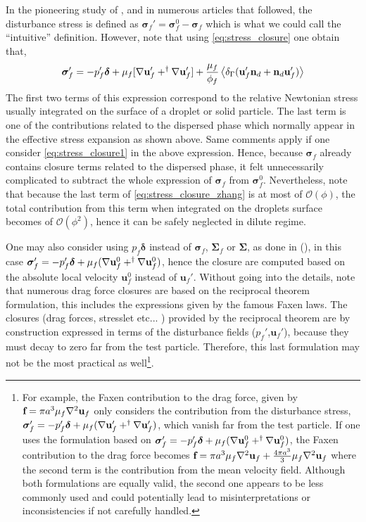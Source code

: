 In the pioneering study of \citep{zhang1997momentum}, and in numerous articles that followed, the disturbance stress is defined as $\bm\sigma_f'= \bm\sigma_f^0 - \bm\sigma_f$ which is what we could call the ``intuitive'' definition. 
However, note that using \ref{eq:stress_closure} one obtain that, 
\begin{equation}
    \bm\sigma_f'
    =
    -p_f'\bm\delta
    + \mu_f [
        \grad \textbf{u}_f'
        + ^\dagger \grad \textbf{u}_f'
    ]
    + \frac{\mu_f}{\phi_f} \avg{\delta_\Gamma( \textbf{u}_f'  \textbf{n}_d +  \textbf{n}_d \textbf{u}_f' )}
    \label{eq:stress_closure_zhang}
\end{equation}
The first two terms of this expression correspond to the relative Newtonian stress usually integrated on the surface of a droplet or solid particle.
The last term is one of the contributions related to the dispersed phase which normally appear in the effective stress expansion as shown above. 
Same comments apply if one consider \ref{eq:stress_closure1} in the above expression. 
Hence, because $\bm\sigma_f$ already contains closure terms related to the dispersed phase, it felt unnecessarily complicated to subtract the whole expression of $\bm\sigma_f$ from $\bm\sigma_f^0$.
Nevertheless, note that because the last term of \ref{eq:stress_closure_zhang} is at most of $\mathcal{O}(\phi)$, the total contribution from this term when integrated on the droplets surface becomes of $\mathcal{O}(\phi^2)$, hence it can be safely neglected in dilute regime. 

One may also consider using $p_f\bm\delta$ instead of $\bm\sigma_f$, $\bm\Sigma_f$ or $\bm\Sigma$, as done in \citet{morel2015mathematical} (), in this case $\bm\sigma_f'  = -p_f' \bm\delta + \mu_f (\mathbf{\nabla} \textbf{u}_f^0 + ^\dagger \mathbf{\nabla} \textbf{u}_f^0)$, hence the closure are computed based on the absolute local velocity $\textbf{u}_f^0$ instead of $\textbf{u}_f'$.
Without going into the details, note that numerous drag force closures are based on the reciprocal theorem formulation, this includes the expressions given by the famous Faxen laws.
The closures (drag forces, stresslet etc... ) provided by the reciprocal theorem are by construction expressed in terms of the disturbance fields ($p_f'$,$\textbf{u}_f'$), because they must decay to zero far from the test particle. 
Therefore, this last formulation may not be the most practical as well\footnote{
For example, the Faxen contribution to the drag force, given by $\textbf{f} = \pi a^3 \mu_f \mathbf{\nabla}^2 \textbf{u}_f$ only considers the contribution from the disturbance stress, $\bm\sigma_f'  = -p_f' \bm\delta + \mu_f (\mathbf{\nabla} \textbf{u}_f' + ^\dagger \mathbf{\nabla} \textbf{u}_f')$, which vanish far from the test particle. 
If one uses the formulation based on $\bm\sigma_f'  = -p_f' \bm\delta + \mu_f (\mathbf{\nabla} \textbf{u}_f^0 + ^\dagger \mathbf{\nabla} \textbf{u}_f^0)$, the Faxen contribution to the drag force becomes $\textbf{f} = \pi a^3 \mu_f \mathbf{\nabla}^2 \textbf{u}_f + \frac{4\pi a^3}{3}\mu_f \mathbf{\nabla}^2 \textbf{u}_f$ where the second term is the contribution from the mean velocity field.
Although both formulations are equally valid, the second one appears to be less commonly used and could potentially lead to misinterpretations or inconsistencies if not carefully handled. 
}. 


